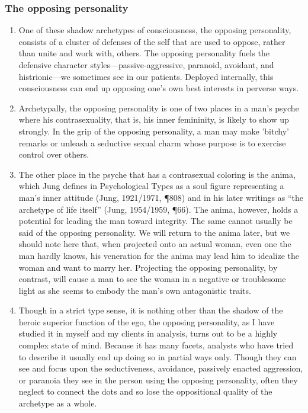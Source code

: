 \subsubsection{The opposing personality}

\begin{enumerate}

\item {} One of these shadow archetypes of consciousness,
the opposing personality, consists of a cluster of defenses of the self that
are used to oppose, rather than unite and work with, others. The opposing
personality fuels the defensive character styles—passive-aggressive, paranoid,
avoidant, and histrionic—we sometimes see in our patients. Deployed internally,
this consciousness can end up opposing one's own best interests in perverse
ways.

\item {} Archetypally, the opposing personality is one of two
places in a man's psyche where his contrasexuality, that is, his inner
femininity, is likely to show up strongly. In the grip of the opposing
personality, a man may make 'bitchy' remarks or unleash a seductive sexual
charm whose purpose is to exercise control over others.

\item {} The other place in the psyche that has a
contrasexual coloring is the anima, which Jung defines in Psychological Types
as a soul figure representing a man's inner attitude (Jung, 1921/1971, ¶808)
and in his later writings as ``the archetype of life itself'' (Jung, 1954/1959,
¶66). The anima, however, holds a potential for leading the man toward
integrity. The same cannot usually be said of the opposing personality. We will
return to the anima later, but we should note here that, when projected onto an
actual woman, even one the man hardly knows, his veneration for the anima may
lead him to idealize the woman and want to marry her. Projecting the opposing
personality, by contrast, will cause a man to see the woman in a negative or
troublesome light as she seems to embody the man's own antagonistic traits.

\item {} Though in a strict type sense, it is nothing
other than the shadow of the heroic superior function of the ego, the opposing
personality, as I have studied it in myself and my clients in analysis, turns
out to be a highly complex state of mind. Because it has many facets, analysts
who have tried to describe it usually end up doing so in partial ways only.
Though they can see and focus upon the seductiveness, avoidance, passively
enacted aggression, or paranoia they see in the person using the opposing
personality, often they neglect to connect the dots and so lose the
oppositional quality of the archetype as a whole.


\end{enumerate}
